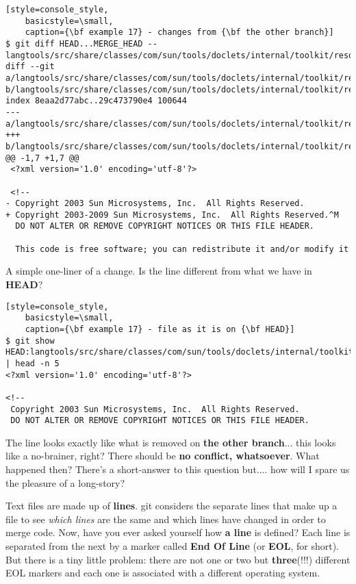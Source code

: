 \begin{lstlisting}[style=console_style,
	basicstyle=\small,
	caption={\bf example 17} - changes from {\bf the other branch}]
$ git diff HEAD...MERGE_HEAD -- langtools/src/share/classes/com/sun/tools/doclets/internal/toolkit/resources/doclet.xml
diff --git a/langtools/src/share/classes/com/sun/tools/doclets/internal/toolkit/resources/doclet.xml b/langtools/src/share/classes/com/sun/tools/doclets/internal/toolkit/resources/doclet.xml
index 8eaa2d77abc..29c473790e4 100644
--- a/langtools/src/share/classes/com/sun/tools/doclets/internal/toolkit/resources/doclet.xml
+++ b/langtools/src/share/classes/com/sun/tools/doclets/internal/toolkit/resources/doclet.xml
@@ -1,7 +1,7 @@
 <?xml version='1.0' encoding='utf-8'?>
 
 <!--
- Copyright 2003 Sun Microsystems, Inc.  All Rights Reserved.
+ Copyright 2003-2009 Sun Microsystems, Inc.  All Rights Reserved.^M
  DO NOT ALTER OR REMOVE COPYRIGHT NOTICES OR THIS FILE HEADER.
 
  This code is free software; you can redistribute it and/or modify it
\end{lstlisting}

A simple one-liner of a change. Is the line different from what we have in {\bf HEAD}?

\begin{lstlisting}[style=console_style,
	basicstyle=\small,
	caption={\bf example 17} - file as it is on {\bf HEAD}]
$ git show HEAD:langtools/src/share/classes/com/sun/tools/doclets/internal/toolkit/resources/doclet.xml | head -n 5
<?xml version='1.0' encoding='utf-8'?>

<!--
 Copyright 2003 Sun Microsystems, Inc.  All Rights Reserved.
 DO NOT ALTER OR REMOVE COPYRIGHT NOTICES OR THIS FILE HEADER.
\end{lstlisting}

The line looks exactly like what is removed on {\bf the other branch}... this looks like a no-brainer, right? There should be {\bf no
conflict, whatsoever}. What happened then? There's a short-answer to this question but.... how will I spare us the pleasure of a
long-story?

Text files are made up of {\bf lines}. git considers the separate lines that make up a file to see {\it which lines} are the same
and which lines have changed in order to merge code. Now, have you ever asked yourself how {\bf a line} is defined? Each line is
separated from the next by a marker called {\bf End Of Line} (or {\bf EOL}, for short). But there is a tiny little problem: there are
not one or two but {\bf three}(!!!) different EOL markers and each one is associated with a different operating system.

